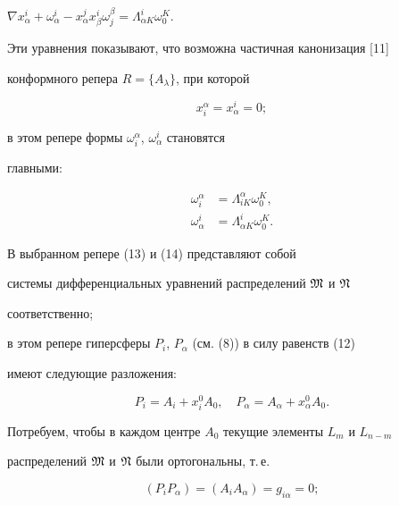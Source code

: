 $\nabla x^i_\alpha+\omega^i_\alpha-x^j_\alpha x^i_\beta 


\omega^\beta_j=\Lambda^i_{\alpha K}\omega^K_0$. 


Эти уравнения показывают, что возможна частичная канонизация [11] 


конформного репера $R=\{A_\lambda\}$, при которой 


\begin{equation} 


x^\alpha_i=x^i_\alpha=0; 


\end{equation} 


в этом репере формы $\omega^\alpha_i$, $\omega^i_\alpha$ становятся 


главными: 


\begin{align} 


\omega^\alpha_i&=\Lambda^\alpha_{iK}\omega^K_0,\\ 


\omega^i_\alpha&=\Lambda^i_{\alpha K}\omega^K_0. 


\end{align} 


В выбранном репере (13) и (14) представляют собой 


системы дифференциальных уравнений распределений $\frak M$ и $\frak N$ 


соответственно; 


в этом репере гиперсферы $P_i$, $P_\alpha$ (см. (8)) в силу равенств (12) 


имеют следующие разложения: 


\begin{equation} 


P_i=A_i+x^0_i A_0,\quad 


P_\alpha=A_\alpha+x^0_\alpha A_0. 


\end{equation} 


 


Потребуем, чтобы в каждом центре $A_0$ текущие элементы $L_m$ и $L_{n-m}$ 


распределений $\frak M$ и $\frak N$ были ортогональны, т.\,е. 


\begin{equation} 


(P_i P_\alpha)=(A_i A_\alpha)=g_{i\alpha}=0; 


\end{equation} 


